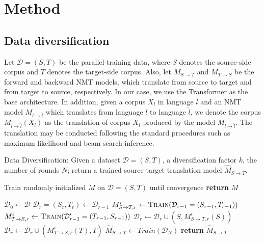 \documentclass{article}
\def\gD{{\mathcal{D}}}
\begin{document}
 
\section{Method}


\subsection{Data diversification} \label{subsec:datadiver}

Let $\gD = (S, T)$ be the parallel training data, where $S$ denotes the source-side corpus and $T$ denotes the target-side corpus. Also, {let $M_{S \rightarrow T}$ and $M_{T \rightarrow S}$} be the forward and backward NMT models, which translate from source to target and from target to source, respectively. In our case, we use the Transformer \citep{vaswani2017attention} as the base architecture. In addition, given a corpus $X_l$ in language $l$ and an NMT model $M_{l \rightarrow \hat{l}}$ which translates from language $l$ to language $\hat{l}$, we denote the corpus $M_{l \rightarrow \hat{l}}(X_l)$ as the translation of corpus $X_l$ produced by the model $M_{l \rightarrow \hat{l}}$. The translation may be conducted following the standard procedures such as maximum likelihood and beam search inference.



\begin{algorithm*}[t!]
\caption{Data Diversification: Given a dataset $\gD=(S,T)$, a diversification factor $k$, the number of rounds $N$; return a trained source-target translation model $\hat{M}_{S \rightarrow T}$.}
\label{alg:data_diverse}
\begin{algorithmic}[1]
\Procedure{Train}{$\gD = (S,T)$}
\State Train randomly initialized $M$ on $\gD=(S,T)$ until convergence
    \State \textbf{return} $M$
\EndProcedure
\end{algorithmic}
\begin{algorithmic}[1]
\Procedure{DataDiverse}{$\gD=(S,T), k, N$}
    \State $\gD_0 \gets \gD$  
        \State $\gD_r = (S_r, T_r) \gets \gD_{r-1}$
            \State $M_{S \rightarrow T,r}^i \gets \textsc{Train}(\gD_{r-1}=(S_{r-1},T_{r-1}))$ 
            \State $M_{T \rightarrow S,r}^i \gets \textsc{Train}(\gD'_{r-1}=(T_{r-1},S_{r-1}))$ 
            \State $\gD_r \gets \gD_r \cup (S,M_{S \rightarrow T,r}^i(S))$  
            \State $\gD_r \gets \gD_r \cup (M_{T \rightarrow S,r}^i(T),T)$  
        \EndFor
    \EndFor
    \State $\hat{M}_{S \rightarrow T} \gets Train(\gD_N)$  
    \State \textbf{return} $\hat{M}_{S \rightarrow T}$
\EndProcedure
\end{algorithmic}
\end{algorithm*}
\end{document}
